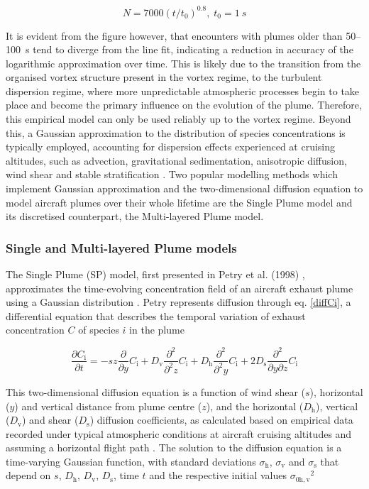 \begin{equation}
	N = 7000(t/t_0)^{0.8}, \; 	t_0 = 1~s 
	\label{N_equation}
	\end{equation}
	
It is evident from the figure however, that encounters with plumes older than 50--100~s tend to diverge from the line fit, indicating a reduction in accuracy of the logarithmic approximation over time. This is likely due to the transition from the organised vortex structure present in the vortex regime, to the turbulent dispersion regime, where more unpredictable atmospheric processes begin to take place and become the primary influence on the evolution of the plume. Therefore, this empirical model can only be used reliably up to the vortex regime. Beyond this, a Gaussian approximation to the distribution of species concentrations is typically employed, accounting for dispersion effects experienced at cruising altitudes, such as advection, gravitational sedimentation, anisotropic diffusion, wind shear and stable stratification \cite{Konopka1995}. Two popular modelling methods which implement Gaussian approximation and the two-dimensional diffusion equation to model aircraft plumes over their whole lifetime are the Single Plume model and its discretised counterpart, the Multi-layered Plume model.

\subsubsection{Single and Multi-layered Plume models}
The Single Plume (SP) model, first presented in Petry et al. (1998) \cite{Petry1998}, approximates the time-evolving concentration field of an aircraft exhaust plume using a Gaussian distribution \cite{Vohralik2008}. Petry represents diffusion through eq. \eqref{diffCi}, a differential equation that describes the temporal variation of exhaust concentration $C$ of species $i$ in the plume

\begin{equation}
	\frac{\partial C_{\mathrm{i}}}{\partial t} = -sz \frac{\partial}{\partial y} C_{\mathrm{i}} + D_{\mathrm{v}} \frac{\partial^2}{\partial^2 z} C_{\mathrm{i}} + D_{\mathrm{h}} \frac{\partial^2}{\partial^2 y} C_{\mathrm{i}} + 2D_{\mathrm{s}} \frac{\partial^2}{\partial y \partial z} C_{\mathrm{i}}
	\label{diffCi}
\end{equation}

This two-dimensional diffusion equation is a function of wind shear ($s$), horizontal ($y$) and vertical distance from plume centre ($z$), and the horizontal ($D_{\mathrm{h}}$), vertical ($D_{\mathrm{v}}$) and shear ($D_{\mathrm{s}}$) diffusion coefficients, as calculated based on empirical data recorded under typical atmospheric conditions at aircraft cruising altitudes and assuming a horizontal flight path \cite{Durbeck1995}. The solution to the diffusion equation is a time-varying Gaussian function, with standard deviations $\sigma_{\mathrm{h}}$, $\sigma_{\mathrm{v}}$ and $\sigma_{\mathrm{s}}$ that depend on $s$, $D_{\mathrm{h}}$, $D_{\mathrm{v}}$, $D_{\mathrm{s}}$, time $t$ and the respective initial values ${\sigma_{\mathrm{0h, v}}}^2$


